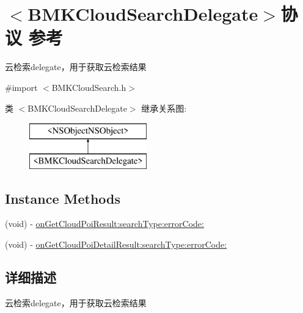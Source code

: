 \hypertarget{protocol_b_m_k_cloud_search_delegate-p}{\section{$<$B\+M\+K\+Cloud\+Search\+Delegate$>$协议 参考}
\label{protocol_b_m_k_cloud_search_delegate-p}
}


云检索delegate，用于获取云检索结果  




{\ttfamily \#import $<$B\+M\+K\+Cloud\+Search.\+h$>$}

类 $<$B\+M\+K\+Cloud\+Search\+Delegate$>$ 继承关系图\+:\begin{figure}[H]
\begin{center}
\leavevmode
\includegraphics[height=2.000000cm]{protocol_b_m_k_cloud_search_delegate-p}
\end{center}
\end{figure}
\subsection*{Instance Methods}
\begin{DoxyCompactItemize}
\item 
(void) -\/ \hyperlink{protocol_b_m_k_cloud_search_delegate-p_aadc90dad37954d8527d4aca657c802f4}{on\+Get\+Cloud\+Poi\+Result\+:search\+Type\+:error\+Code\+:}
\item 
(void) -\/ \hyperlink{protocol_b_m_k_cloud_search_delegate-p_a5abcb777d4533baa036beb635268b60d}{on\+Get\+Cloud\+Poi\+Detail\+Result\+:search\+Type\+:error\+Code\+:}
\end{DoxyCompactItemize}


\subsection{详细描述}
云检索delegate，用于获取云检索结果 

